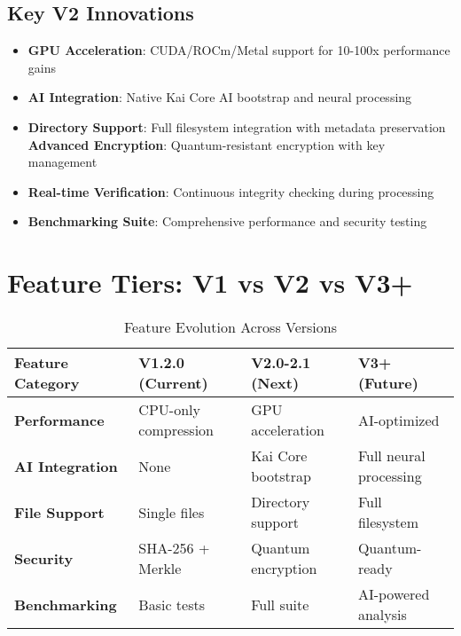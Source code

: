 \documentclass[12pt,a4paper]{article}
\begin{document}
\subsection{Key V2 Innovations}
\begin{itemize}
    \item \textbf{GPU Acceleration}: CUDA/ROCm/Metal support for 10-100x performance gains
    \item \textbf{AI Integration}: Native Kai Core AI bootstrap and neural processing
    \item \textbf{Directory Support}: Full filesystem integration with metadata preservation
    \textbf{Advanced Encryption}: Quantum-resistant encryption with key management
    \item \textbf{Real-time Verification}: Continuous integrity checking during processing
    \item \textbf{Benchmarking Suite}: Comprehensive performance and security testing
\end{itemize}

\section{Feature Tiers: V1 vs V2 vs V3+}

\begin{table}[h]
\centering
\begin{tabular}{|l|l|l|l|}
\hline
\textbf{Feature Category} & \textbf{V1.2.0 (Current)} & \textbf{V2.0-2.1 (Next)} & \textbf{V3+ (Future)} \\
\hline
\rowcolor{v2blue!10}
\textbf{Performance} & CPU-only compression & GPU acceleration & AI-optimized \\
\hline
\textbf{AI Integration} & None & Kai Core bootstrap & Full neural processing \\
\hline
\textbf{File Support} & Single files & Directory support & Full filesystem \\
\hline
\textbf{Security} & SHA-256 + Merkle & Quantum encryption & Quantum-ready \\
\hline
\textbf{Benchmarking} & Basic tests & Full suite & AI-powered analysis \\
\hline
\end{tabular}
\caption{Feature Evolution Across Versions}
\end{table}
\end{document}

